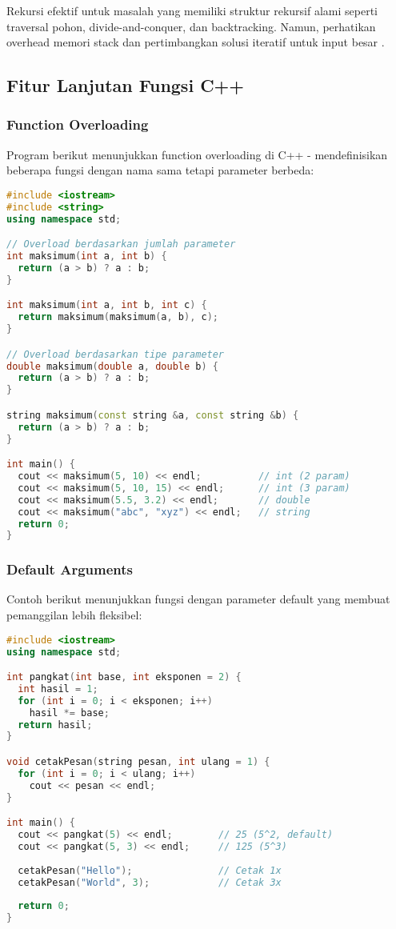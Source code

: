 \documentclass[../main.tex]{subfiles}
\begin{document}
Rekursi efektif untuk masalah yang memiliki struktur rekursif alami seperti traversal pohon, divide-and-conquer, dan backtracking. Namun, perhatikan overhead memori stack dan pertimbangkan solusi iteratif untuk input besar \parencite{cpp-reference,gnu-c-manual}.

\subsection{Fitur Lanjutan Fungsi C++}
\subsubsection{Function Overloading}

Program berikut menunjukkan function overloading di C++ - mendefinisikan beberapa fungsi dengan nama sama tetapi parameter berbeda:

\begin{lstlisting}[language=C++, caption={Overloading fungsi}]
#include <iostream>
#include <string>
using namespace std;

// Overload berdasarkan jumlah parameter
int maksimum(int a, int b) {
  return (a > b) ? a : b;
}

int maksimum(int a, int b, int c) {
  return maksimum(maksimum(a, b), c);
}

// Overload berdasarkan tipe parameter
double maksimum(double a, double b) {
  return (a > b) ? a : b;
}

string maksimum(const string &a, const string &b) {
  return (a > b) ? a : b;
}

int main() {
  cout << maksimum(5, 10) << endl;          // int (2 param)
  cout << maksimum(5, 10, 15) << endl;      // int (3 param)
  cout << maksimum(5.5, 3.2) << endl;       // double
  cout << maksimum("abc", "xyz") << endl;   // string
  return 0;
}
\end{lstlisting}

\subsubsection{Default Arguments}

Contoh berikut menunjukkan fungsi dengan parameter default yang membuat pemanggilan lebih fleksibel:

\begin{lstlisting}[language=C++, caption={Default argument}]
#include <iostream>
using namespace std;

int pangkat(int base, int eksponen = 2) {
  int hasil = 1;
  for (int i = 0; i < eksponen; i++)
    hasil *= base;
  return hasil;
}

void cetakPesan(string pesan, int ulang = 1) {
  for (int i = 0; i < ulang; i++)
    cout << pesan << endl;
}

int main() {
  cout << pangkat(5) << endl;        // 25 (5^2, default)
  cout << pangkat(5, 3) << endl;     // 125 (5^3)
  
  cetakPesan("Hello");               // Cetak 1x
  cetakPesan("World", 3);            // Cetak 3x
  
  return 0;
}
\end{lstlisting}
\end{document}

